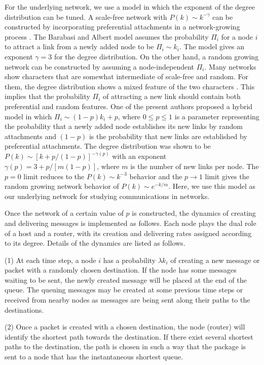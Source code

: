\documentclass[aps,prl,twocolumn,superscriptaddress,showpacs]{revtex4}
\begin{document}
For the underlying network, we use a model in which the exponent
of the degree distribution can be tuned.  A scale-free network
with $P(k) \sim k^{-\gamma}$ can be constructed by incorporating
preferential attachments in a network-growing process
\cite{BA:1999,LL:2002}.  The Barabasi and Albert model
\cite{BA:1999} assumes the probability $\Pi_i$ for a node $i$ to
attract a link from a newly added node to be $\Pi_i \sim k_i$. The
model gives an exponent $\gamma = 3$ \cite{BA:1999} for the degree
distribution.  On the other hand, a random growing network can be
constructed by assuming a node-independent $\Pi_{i}$. Many
networks show characters that are somewhat intermediate of
scale-free and random.  For them, the degree distribution shows a
mixed feature of the two characters \cite{Newm:2001}.  This
implies that the probability $\Pi_i$ of attracting a new link
should contain both preferential and random features.  One of the
present authors proposed a hybrid model \cite{LLYD:2002} in which
$\Pi_i \sim (1-p)k_i+p$, where $0 \le p \le 1$ is a parameter
representing the probability that a newly added node establishes
its new links by random attachments and $(1-p)$ is the probability
that new links are established by preferential attachments.  The
degree distribution was shown to be \cite{LLYD:2002} $P(k) \sim
[k+p/(1-p)]^{-\gamma(p)}$ with an exponent $\gamma(p) = 3 +
p/[m(1-p)]$, where $m$ is the number of new links per node.  The
$p=0$ limit reduces to the $P(k) \sim k^{-3}$ behavior and the $p
\rightarrow 1$ limit gives the random growing network behavior of
$P(k) \sim e^{-k/m}$.  Here, we use this model as our underlying
network for studying communications in networks.

Once the network of a certain value of $p$ is constructed, the
dynamics of creating and delivering messages is implemented as
follows.  Each node plays the dual role of a host and a router,
with its creation and delivering rates assigned according to its
degree.  Details of the dynamics are listed as follows.

\noindent (1) At each time step, a node $i$ has a probability
$\lambda k_i$ of creating a new message or packet with a randomly
chosen destination. If the node has some messages waiting to be
sent, the newly created message will be placed at the end of the
queue.  The queuing messages may be created at some previous time
steps or received from nearby nodes as messages are being sent
along their paths to the destinations.

\noindent (2) Once a packet is created with a chosen destination,
the node (router) will identify the shortest path towards the
destination. If there exist several shortest paths to the
destination, the path is chosen in such a way that the package is
sent to a node that has the instantaneous shortest queue.
\end{document}
